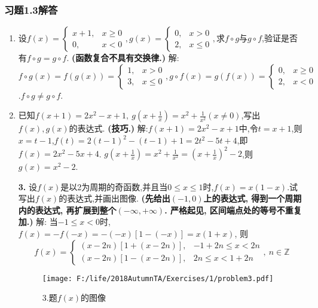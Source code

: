 \documentclass[12pt,UTF8]{ctexart}
\begin{document}
\subsubsection{习题1.3解答}
\begin{enumerate}
\item 设$f(x)=\begin{cases}x+1,&x\geq0\\0,&x<0\end{cases},g(x)=\begin{cases}0,&x>0\\2,&x\leq0\end{cases},$求$f\circ g$与$g\circ f$,验证是否有$f\circ g=g\circ f$.
\newline
{\bf(函数复合不具有交换律.)}
\newline
解:$f\circ g(x)=f(g(x))=\begin{cases}1,&x>0\\3,&x\leq0\end{cases},g\circ f(x)=g(f(x))=\begin{cases}0,&x\geq0\\2,&x<0\end{cases}$.$f\circ g\neq g\circ f$.
\item 已知$f(x+1)=2x^2-x+1,\ g(x+\frac1x)=x^2+\frac1{x^2}(x\neq0)$,写出$f(x),g(x)$的表达式.
\newline
{\bf(技巧.)}
\newline
解:$f(x+1)=2x^2-x+1$中,令$t=x+1$,则$x=t-1$,$f(t)=2(t-1)^2-(t-1)+1=2t^2-5t+4$,即$f(x)=2x^2-5x+4$.
\newline
$g(x+\frac1x)=x^2+\frac1{x^2}=(x+\frac1x)^2-2$,则$g(x)=x^2-2$.
\item[\bf3.] 设$f(x)$是以2为周期的奇函数,并且当$0\leq x\leq1$时,$f(x)=x(1-x)$.试写出$f(x)$的表达式,并画出图像.
\newline
{\bf(先给出$(-1,0)$上的表达式, 得到一个周期内的表达式, 再扩展到整个$(-\infty,+\infty)$. 严格起见, 区间端点处的等号不重复加.)}
\newline
解: 当$-1\leq x<0$时, $f(x)=-f(-x)=-(-x)[1-(-x)]=x(1+x)$, 则
\[
f(x)=\begin{cases}
(x-2n)[1+(x-2n)],&-1+2n\leq x<2n\\
(x-2n)[1-(x-2n)],&2n\leq x<1+2n
\end{cases},\ n\in\mathbb Z
\]
\begin{figure}[H]
\begin{center}
\texttt{[image: F:/life/2018AutumnTA/Exercises/1/problem3.pdf]}
\end{center}
\caption{3.题$f(x)$的图像}

\end{figure}
\end{enumerate}
\end{document}

